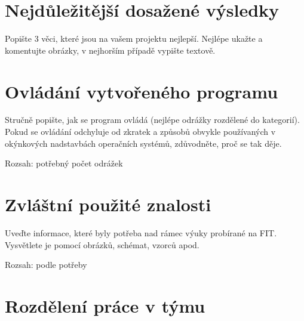 \documentclass[11pt,a4paper]{article}
\begin{document}
\section{Nejdůležitější dosažené výsledky}

Popište 3 věci, které jsou na vašem projektu nejlepší. Nejlépe ukažte a
komentujte obrázky, v nejhorším případě vypište textově.

\section{Ovládání vytvořeného programu}

Stručně popište, jak se program ovládá (nejlépe odrážky rozdělené do
kategorií). Pokud se ovládání odchyluje od zkratek a způsobů obvykle
používaných v okýnkových nadstavbách operačních systémů, zdůvodněte, proč se
tak děje.

Rozsah: potřebný počet odrážek

\section{Zvláštní použité znalosti}

Uveďte informace, které byly potřeba nad rámec výuky probírané na FIT.
Vysvětlete je pomocí obrázků, schémat, vzorců apod. 

Rozsah: podle potřeby 

\section{Rozdělení práce v týmu}

%
\end{document}
